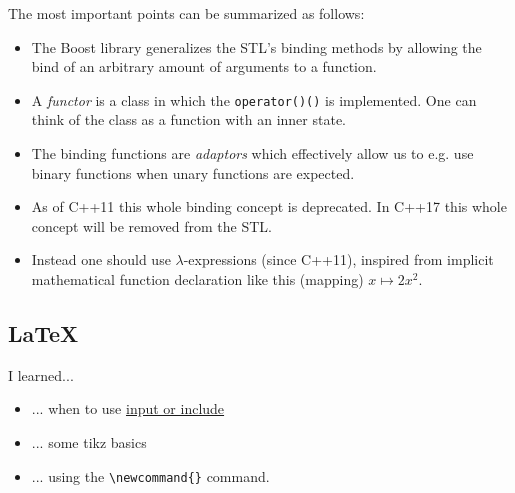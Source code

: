 \documentclass{article}
\begin{document}
The most important points can be summarized as follows:
\begin{itemize}
	\item The Boost library generalizes the STL's binding methods by allowing the bind of an arbitrary amount of arguments to a function.
	\item A \emph{functor} is a class in which the \texttt{operator()()} is implemented. One can think of the class as a function with an inner state.
	\item The binding functions are \emph{adaptors} which effectively allow us to e.g. use binary functions when unary functions are expected.
	\item As of C++11 this whole binding concept is deprecated. In C++17 this whole concept will be removed from the STL. 
	\item Instead one should use $\lambda$-expressions (since C++11), inspired from implicit mathematical function declaration like this (mapping) $ x \mapsto 2x^2 $.
\end{itemize}

\subsection{\LaTeX}

I learned...

\begin{itemize}
	\item ... when to use \href{https://tex.stackexchange.com/questions/246/when-should-i-use-input-vs-include}{input or include}
	\item ... some tikz basics
	\item ... using the \verb|\newcommand{}| command.
\end{itemize}
\end{document}
